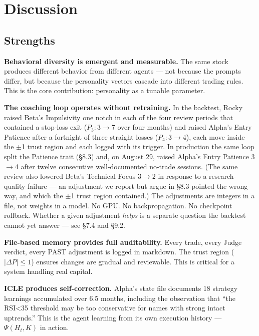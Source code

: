 \documentclass[11pt]{article}
\begin{document}
\section{Discussion}\label{discussion}

\subsection{Strengths}\label{strengths}

\textbf{Behavioral diversity is emergent and measurable.} The same stock produces different behavior from different agents --- not because the prompts differ, but because the personality vectors cascade into different trading rules. This is the core contribution: personality as a tunable parameter.

\textbf{The coaching loop operates without retraining.} In the backtest, Rocky raised Beta's Impulsivity one notch in each of the four review periods that contained a stop-loss exit (\(P_3: 3 \to 7\) over four months) and raised Alpha's Entry Patience after a fortnight of three straight losses (\(P_4: 3 \to 4\)), each move inside the $\pm$1 trust region and each logged with its trigger. In production the same loop split the Patience trait (§8.3) and, on August 29, raised Alpha's Entry Patience 3$\rightarrow$4 after twelve consecutive well-documented no-trade sessions. (The same review also lowered Beta's Technical Focus 3$\rightarrow$2 in response to a research-quality failure --- an adjustment we report but argue in §8.3 pointed the wrong way, and which the $\pm$1 trust region contained.) The adjustments are integers in a file, not weights in a model. No GPU. No backpropagation. No checkpoint rollback. Whether a given adjustment \emph{helps} is a separate question the backtest cannot yet answer --- see §7.4 and §9.2.

\textbf{File-based memory provides full auditability.} Every trade, every Judge verdict, every PAST adjustment is logged in markdown. The trust region (\(\lvert \Delta P \rvert \leq 1\)) ensures changes are gradual and reviewable. This is critical for a system handling real capital.

\textbf{ICLE produces self-correction.} Alpha's state file documents 18 strategy learnings accumulated over 6.5 months, including the observation that ``the RSI\textless35 threshold may be too conservative for names with strong intact uptrends.'' This is the agent learning from its own execution history --- \(\Psi(H_t, K)\) in action.
\end{document}
